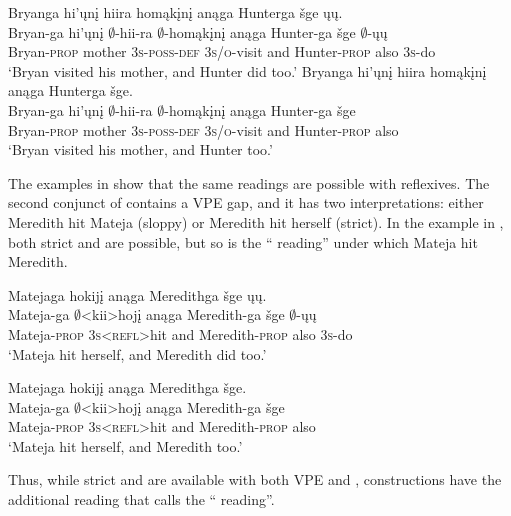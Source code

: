 \documentclass[output=paper]{LSP/langsci}
\begin{document}
 
\ea\label{ex:johnson:44}
\ea\label{ex:johnson:44a} 
\glll Bryanga hi'ųnį hiira homąkįnį anąga Hunterga šge ųų.\\
Bryan-ga hi'ųnį $\emptyset$-hii-ra $\emptyset$-homąkįnį anąga Hunter-ga šge $\emptyset$-ųų\\
Bryan-\textsc{prop} mother \textsc{3s-poss-def} \textsc{3s/o}-visit and Hunter-\textsc{prop} also \textsc{3s}-do\\
\trans `Bryan visited his mother, and Hunter did too.'
\ex\label{ex:johnson:44b}
\glll Bryanga hi'ųnį hiira homąkįnį anąga Hunterga šge.\\
Bryan-ga hi'ųnį $\emptyset$-hii-ra $\emptyset$-homąkįnį anąga Hunter-ga šge\\
Bryan-\textsc{prop} mother \textsc{3s-poss-def} \textsc{3s/o}-visit and Hunter-\textsc{prop} also\\
\trans `Bryan visited his mother, and Hunter too.'
\z
\z

The examples in  show that the same readings are possible with reflexives. The second conjunct of  contains a VPE gap, and it has two interpretations: either Meredith hit Mateja (sloppy) or Meredith hit herself (strict). In the  example in , both strict and  are possible, but so is the `` reading'' under which Mateja hit Meredith.
 
\ea\label{ex:johnson:45}
\ea\label{ex:johnson:45a} 
\glll Matejaga hokijį anąga Meredithga šge ųų.\\
Mateja-ga $\emptyset$<kii>hojį anąga Meredith-ga šge $\emptyset$-ųų\\
Mateja-\textsc{prop} \textsc{3s}<\textsc{refl}>hit and Meredith-\textsc{prop} also \textsc{3s}-do\\
\trans `Mateja hit herself, and Meredith did too.'

\ex\label{ex:johnson:45b}
\glll Matejaga hokijį anąga Meredithga šge.\\
Mateja-ga $\emptyset$<kii>hojį anąga Meredith-ga šge\\ 
Mateja-\textsc{prop} \textsc{3s}<\textsc{refl}>hit and Meredith-\textsc{prop} also\\ 
\trans `Mateja hit herself, and Meredith too.'
\z
\z

Thus, while strict and  are available with both VPE and ,  constructions have the additional reading that \citet{Fortin2007} calls the `` reading''.
\end{document}
